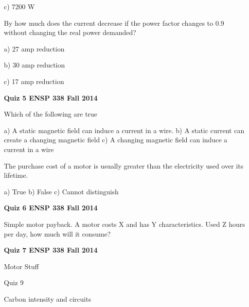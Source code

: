 \documentclass[12pt, oneside]{article}
\begin{document}
c) 7200 W


\problem{}

By how much does the current decrease if the power factor changes to
0.9 without changing the real power demanded?

a) 27 amp reduction

b) 30 amp reduction

c) 17 amp reduction



\newpage
{\bf Quiz 5 \hfill ENSP 338 \hfill Fall 2014}


Which of the following are true

a) A static magnetic field can induce a current in a wire.
b) A static current can create a changing magnetic field
c) A changing magnetic field can induce a current in a wire

\solution{

}

The purchase cost of a motor is usually greater than the electricity
used over its lifetime.

a) True
b) False
c) Cannot distinguish
\vfill

\newpage
{\bf Quiz 6 \hfill ENSP 338 \hfill Fall 2014}


\problem{}
Simple motor payback.  A motor costs X and has Y characteristics.  Used
Z hours per day, how much will it consume?


\newpage
{\bf Quiz 7 \hfill ENSP 338 \hfill Fall 2014}

Motor Stuff



\newpage
Quiz 9

Carbon intensity and circuits
\end{document}

